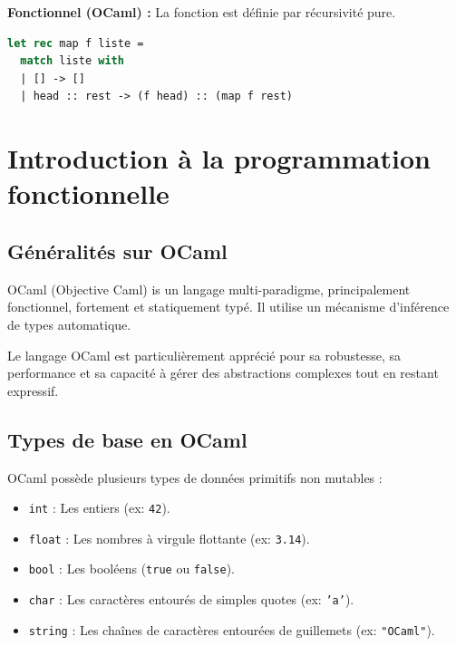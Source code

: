 \documentclass{article}
\begin{document}
\noindent\textbf{Fonctionnel (OCaml) :} La fonction est définie par récursivité pure.
\begin{lstlisting}[language=Caml]
let rec map f liste =
  match liste with
  | [] -> []
  | head :: rest -> (f head) :: (map f rest)
\end{lstlisting}

\section{Introduction à la programmation fonctionnelle}

\subsection{Généralités sur OCaml}

OCaml (Objective Caml) is un langage multi-paradigme, principalement fonctionnel, fortement et statiquement typé. Il utilise un mécanisme d'inférence de types automatique.



Le langage OCaml est particulièrement apprécié pour sa robustesse, sa performance et sa capacité à gérer des abstractions complexes tout en restant expressif.

\subsection{Types de base en OCaml}

OCaml possède plusieurs types de données primitifs non mutables :

\begin{itemize}
    \item \texttt{int} : Les entiers (ex: \texttt{42}).
    \item \texttt{float} : Les nombres à virgule flottante (ex: \texttt{3.14}).
    \item \texttt{bool} : Les booléens (\texttt{true} ou \texttt{false}).
    \item \texttt{char} : Les caractères entourés de simples quotes (ex: \texttt{'a'}).
    \item \texttt{string} : Les chaînes de caractères entourées de guillemets (ex: \texttt{"OCaml"}).
\end{itemize}
\end{document}

